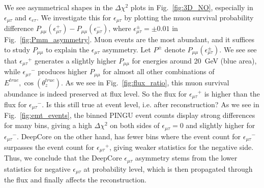 \documentclass[draft=True]{revtex4-2}
\newcommand{\ztrue}{\ensuremath{\cos{(\theta_z^{true})}}}
\newcommand{\emt}{\ensuremath{\epsilon_{\mu\tau}}}
\newcommand{\eet}{\epsilon_{e\tau}}
\newcommand{\Etrue}{E^{true}}
\begin{document}
{We see asymmetrical shapes in the $\Delta \chi^2$ plots in Fig.~\ref{fig:3D_NO}, especially in $\emt$ and $\eet$.%
We investigate this for $\emt$ by plotting the muon survival probability difference $P_{\mu\mu}(\epsilon^+_{\mu\tau}) - P_{\mu\mu}(\epsilon^-_{\mu\tau})$, where 
$\epsilon^\pm_{\mu\tau} = \pm 0.01$ in Fig.~\ref{fig:Pmm_asymmetry}.
Muon events are the most abundant, and it suffices to study $P_{\mu\mu}$ to explain the $\emt$ asymmetry. 
Let $P^\pm$ denote $P_{\mu\mu}(\epsilon^\pm_{\mu\tau})$. 
We see see that $\emt^+$ generates a slightly higher $P_{\mu\mu}$ for energies around \SI{20}{\GeV} (blue area),
while $\emt^-$ produces higher $P_{\mu\mu}$ for almost all other combinations of ${\Etrue,\ztrue}$. As we see in Fig.~\ref{fig:flux_ratio}, this muon survival abundance 
is indeed preserved at flux level. So the flux for $\emt^+$ is higher than the flux for $\emt^-$. Is this still true at event level, i.e. after reconstruction? 
As we see in Fig.~\ref{fig:emt_events}, the binned PINGU event counts display strong differences for many bins, giving a high $\Delta \chi^2$ on both sides of $\emt=0$ and slightly higher for $\emt^-$. DeepCore on the other hand, 
has fewer bins where the event count for $\emt^-$ surpasses the event count for $\emt^+$, giving weaker statistics for the negative side. Thus, we conclude that the DeepCore
$\emt$ asymmetry stems from the lower statistics for negative $\emt$ at probability level, which is then propagated through the flux and finally affects the reconstruction. %

}
\end{document}
